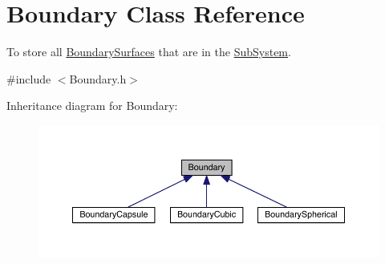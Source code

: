 \hypertarget{classBoundary}{\section{Boundary Class Reference}
\label{classBoundary}
}


To store all \hyperlink{classBoundarySurface}{Boundary\+Surfaces} that are in the \hyperlink{classSubSystem}{Sub\+System}.  




{\ttfamily \#include $<$Boundary.\+h$>$}



Inheritance diagram for Boundary\+:
\nopagebreak
\begin{figure}[H]
\begin{center}
\leavevmode
\includegraphics[width=350pt]{classBoundary__inherit__graph}
\end{center}
\end{figure}


